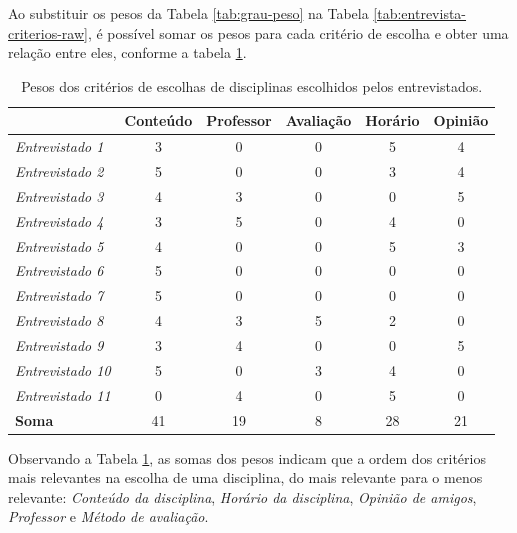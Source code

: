 Ao substituir os pesos da Tabela \ref{tab:grau-peso} na Tabela \ref{tab:entrevista-criterios-raw}, é possível somar os pesos para cada critério de escolha e obter uma relação entre eles, conforme a tabela \ref{tab:entrevista-criterios-peso}.

\begin{table}[!ht]
    \begin{center}
        \begin{tabular}{ l|c|c|c|c|c } 
            & Conteúdo & Professor & Avaliação & Horário & Opinião \\ 
            \hline 
            \textit{Entrevistado 1 } & 3 & 0 & 0 & 5 & 4 \\     %
            \textit{Entrevistado 2 } & 5 & 0 & 0 & 3 & 4 \\     %
            \textit{Entrevistado 3 } & 4 & 3 & 0 & 0 & 5 \\     %
            \textit{Entrevistado 4 } & 3 & 5 & 0 & 4 & 0 \\     %
            \textit{Entrevistado 5 } & 4 & 0 & 0 & 5 & 3 \\     %
            \textit{Entrevistado 6 } & 5 & 0 & 0 & 0 & 0 \\     %
            \textit{Entrevistado 7 } & 5 & 0 & 0 & 0 & 0 \\     %
            \textit{Entrevistado 8 } & 4 & 3 & 5 & 2 & 0 \\     %
            \textit{Entrevistado 9 } & 3 & 4 & 0 & 0 & 5 \\     %
            \textit{Entrevistado 10} & 5 & 0 & 3 & 4 & 0 \\     %
            \textit{Entrevistado 11} & 0 & 4 & 0 & 5 & 0 \\     %
            \hline
            \textbf{Soma}            & 41& 19& 8 & 28& 21 
        \end{tabular}
    \end{center}
    \caption{Pesos dos critérios de escolhas de disciplinas escolhidos pelos entrevistados.}
    \label{tab:entrevista-criterios-peso}
\end{table}

Observando a Tabela \ref{tab:entrevista-criterios-peso}, as somas dos pesos indicam que a ordem dos critérios mais relevantes na escolha de uma disciplina, do mais relevante para o menos relevante:
\textit{Conteúdo da disciplina}, \textit{Horário da disciplina}, \textit{Opinião de amigos}, \textit{Professor} e \textit{Método de avaliação}.

